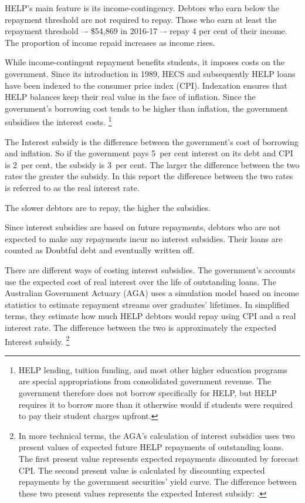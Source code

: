 \documentclass[embargoed]{grattan}
\begin{document}
\gls{HELP}’s main feature is its income-contingency.
Debtors who earn below the repayment threshold are not required to repay. 
Those who earn at least the repayment threshold –- \$54,869 in 2016-17 –- repay 4 per cent of their income. 
The proportion of income repaid increases as income rises. 

While income-contingent repayment benefits students, it imposes costs on the government. 
Since its introduction in 1989, \gls{HECS} and subsequently \gls{HELP} loans have been indexed to the consumer price index (\gls{CPI}\@).
Indexation ensures that \gls{HELP} balances keep their real value in the face of inflation.
Since the government’s borrowing cost tends to be higher than inflation, the government subsidises the interest costs.%
\footnote{HELP lending, tuition funding, and most other higher education programs are special appropriations from consolidated government revenue.
The government therefore does not borrow specifically for \gls{HELP}, but \gls{HELP} requires it to borrow more than it otherwise would if students were required to pay their student charges upfront.}

The \gls{Interest subsidy} is the difference between the government's cost of borrowing and inflation.
So if the government pays 5~per cent interest on its debt and \gls{CPI} is 2~per cent, the subsidy is 3~per cent.
The larger the difference between the two rates the greater the subsidy.
In this report the difference between the two rates is referred to as the real interest rate.

The slower debtors are to repay, the higher the subsidies. 

Since interest subsidies are based on future repayments, debtors who are not expected to make any repayments incur no interest subsidies.
Their loans are counted as \gls{Doubtful debt} and eventually written off.

There are different ways of costing interest subsidies.
The government's accounts use the expected cost of real interest over the life of outstanding loans.
The Australian Government Actuary (\gls{AGA}) uses a simulation model based on income statistics to estimate repayment streams over graduates' lifetimes.
In simplified terms, they estimate how much \gls{HELP} debtors would repay using \gls{CPI} and a real interest rate.
The difference between the two is approximately the expected \gls{Interest subsidy}.%
\footnote{In more technical terms, the \gls{AGA}'s calculation of interest subsidies uses two present values of expected future \gls{HELP} repayments of outstanding loans.
The first present value represents expected repayments discounted by forecast \gls{CPI}\@.
The second present value is calculated by discounting expected repayments by the government securities' yield curve.
The difference between these two present values represents the expected \gls{Interest subsidy}: \textcite[][Appendix~A]{Consulting2013PrivatisationHECSdebt}.}
\end{document}
